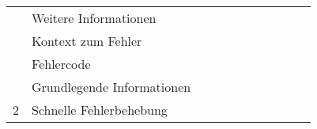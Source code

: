 \begin{table}[htp]
\begin{tabular}{lllllllllll}
                                                                                  & Weitere Informationen                                                                                         &                             &                            &                            &                                  &                      &                         &                                         &                           &                                        \\
                                                                                  & Kontext zum Fehler                                                                                            &                             &                            &                            &                                  &                      &                         &                                         &                           &                                        \\
                                                                                  & Fehlercode                                                                                                    &                             &                            &                            &                                  &                      &                         &                                         &                           &                                        \\
                                                                                  & Grundlegende Informationen                                                                                    &                             &                            &                            &                                  &                      &                         &                                         &                           &                                        \\
    \midrule
    \multirow{6}{*}{2}                                                            & Schnelle Fehlerbehebung                                                                                       &                             &                            &                            &                                  &                      &                         &                                         &                           &                                        \\

\end{tabular}
\end{table}
